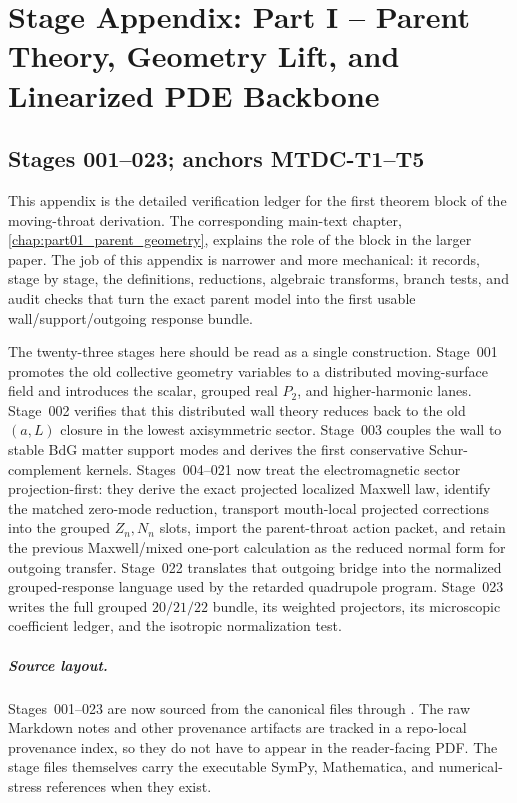 \chapter{Stage Appendix: Part I -- Parent Theory, Geometry Lift, and Linearized PDE Backbone}
\label{app:stage-part-1}

\section*{Stages 001--023; anchors MTDC-T1--T5}

This appendix is the detailed verification ledger for the first theorem block of the moving-throat derivation.  The corresponding main-text chapter, \cref{chap:part01_parent_geometry}, explains the role of the block in the larger paper.  The job of this appendix is narrower and more mechanical: it records, stage by stage, the definitions, reductions, algebraic transforms, branch tests, and audit checks that turn the exact parent model into the first usable wall/support/outgoing response bundle.

The twenty-three stages here should be read as a single construction.  Stage~001 promotes the old collective geometry variables to a distributed moving-surface field and introduces the scalar, grouped real \(P_2\), and higher-harmonic lanes.  Stage~002 verifies that this distributed wall theory reduces back to the old \((a,L)\) closure in the lowest axisymmetric sector.  Stage~003 couples the wall to stable BdG matter support modes and derives the first conservative Schur-complement kernels.  Stages~004--021 now treat the electromagnetic sector projection-first: they derive the exact projected localized Maxwell law, identify the matched zero-mode reduction, transport mouth-local projected corrections into the grouped \(Z_n,N_n\) slots, import the parent-throat action packet, and retain the previous Maxwell/mixed one-port calculation as the reduced normal form for outgoing transfer.  Stage~022 translates that outgoing bridge into the normalized grouped-response language used by the retarded quadrupole program.  Stage~023 writes the full grouped \(20/21/22\) bundle, its weighted projectors, its microscopic coefficient ledger, and the isotropic normalization test.

\paragraph{Source layout.}
Stages~001--023 are now sourced from the canonical files  through .  The raw Markdown notes and other provenance artifacts are tracked in a repo-local provenance index, so they do not have to appear in the reader-facing PDF.  The stage files themselves carry the executable SymPy, Mathematica, and numerical-stress references when they exist.

